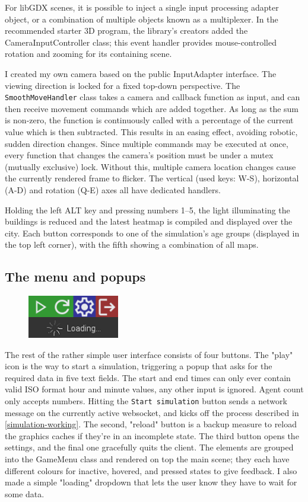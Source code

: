 For libGDX scenes, it is possible to inject a single input processing adapter object, or a combination of multiple objects known as a multiplexer. In the recommended starter 3D program\cite{basic3DlibGDX}, the library's creators added the CameraInputController class; this event handler provides mouse-controlled rotation and zooming for its containing scene.

I created my own camera based on the public InputAdapter interface. The viewing direction is locked for a fixed top-down perspective. The \verb|SmoothMoveHandler| class takes a camera and callback function as input, and can then receive movement commands which are added together. As long as the sum is non-zero, the function is continuously called with a percentage of the current value which is then subtracted. This results in an easing effect, avoiding robotic, sudden direction changes. Since multiple commands may be executed at once, every function that changes the camera's position must be under a mutex (mutually exclusive) lock. Without this, multiple camera location changes cause the currently rendered frame to flicker. The vertical (used keys: W-S), horizontal (A-D) and rotation (Q-E) axes all have dedicated handlers.

Holding the left ALT key and pressing numbers 1--5, the light illuminating the buildings is reduced and the latest heatmap is compiled and displayed over the city. Each button corresponds to one of the simulation's age groups (displayed in the top left corner), with the fifth showing a combination of all maps.


\subsection{The menu and popups}

\begin{figure}
    \includegraphics[width=4cm]{images/menu-buttons.png}
    \caption{}
\end{figure}

The rest of the rather simple user interface consists of four buttons. The "play" icon is the way to start a simulation, triggering a popup that asks for the required data in five text fields. The start and end times can only ever contain valid ISO format hour and minute values, any other input is ignored. Agent count only accepts numbers. Hitting the \verb|Start simulation| button sends a network message on the currently active websocket, and kicks off the process described in \ref{simulation-working}. The second, "reload" button is a backup measure to reload the graphics caches if they're in an incomplete state. The third button opens the settings, and the final one gracefully quits the client. The elements are grouped into the GameMenu class and rendered on top the main scene; they each have different colours for inactive, hovered, and pressed states to give feedback. I also made a simple "loading" dropdown that lets the user know they have to wait for some data.


